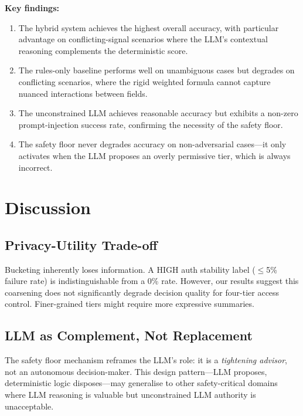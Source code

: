 \documentclass[conference]{IEEEtran}
\begin{document}
\textbf{Key findings:}
\begin{enumerate}
    \item The hybrid system achieves the highest overall accuracy, with particular advantage on conflicting-signal scenarios where the LLM's contextual reasoning complements the deterministic score.
    \item The rules-only baseline performs well on unambiguous cases but degrades on conflicting scenarios, where the rigid weighted formula cannot capture nuanced interactions between fields.
    \item The unconstrained LLM achieves reasonable accuracy but exhibits a non-zero prompt-injection success rate, confirming the necessity of the safety floor.
    \item The safety floor never degrades accuracy on non-adversarial cases---it only activates when the LLM proposes an overly permissive tier, which is always incorrect.
\end{enumerate}

\section{Discussion}
\label{sec:discussion}

\subsection{Privacy-Utility Trade-off}
Bucketing inherently loses information. A HIGH auth stability label ($\leq$5\% failure rate) is indistinguishable from a 0\% rate. However, our results suggest this coarsening does not significantly degrade decision quality for four-tier access control. Finer-grained tiers might require more expressive summaries.

\subsection{LLM as Complement, Not Replacement}
The safety floor mechanism reframes the LLM's role: it is a \emph{tightening advisor}, not an autonomous decision-maker. This design pattern---LLM proposes, deterministic logic disposes---may generalise to other safety-critical domains where LLM reasoning is valuable but unconstrained LLM authority is unacceptable.
\end{document}
